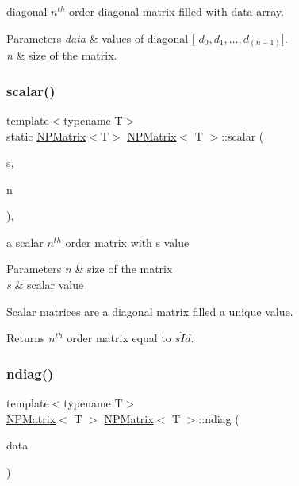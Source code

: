 diagonal $ n^{th} $ order diagonal matrix filled with data array. 


\begin{DoxyParams}{Parameters}
{\em data} & values of diagonal {\ttfamily \mbox{[}} $ d_0, d_1, ..., d_{(n-1)} ${\ttfamily \mbox{]}}. \\
\hline
{\em n} & size of the matrix. \\
\hline
\end{DoxyParams}
\mbox{\label{class_n_p_matrix_a3195b8dd4a279c3018122c3053997f8c}} 
\subsubsection{\texorpdfstring{scalar()}{scalar()}}
{\footnotesize\ttfamily template$<$typename T$>$ \\
static \mbox{\hyperlink{class_n_p_matrix}{N\+P\+Matrix}}$<$T$>$ \mbox{\hyperlink{class_n_p_matrix}{N\+P\+Matrix}}$<$ T $>$\+::scalar (\begin{DoxyParamCaption}\item[{T}]{s,  }\item[{\mbox{\hyperlink{typedef_8h_a1b140a2034db3f5dfe18a987745df43a}{ul\+\_\+t}}}]{n }\end{DoxyParamCaption})\hspace{0.3cm}{\ttfamily [inline]}, {\ttfamily [static]}}



a scalar $ n^{th} $ order matrix with {\ttfamily s} value 


\begin{DoxyParams}{Parameters}
{\em n} & size of the matrix \\
\hline
{\em s} & scalar value\\
\hline
\end{DoxyParams}
Scalar matrices are a diagonal matrix filled a unique value. \begin{DoxyReturn}{Returns}
$ n^{th} $ order matrix equal to $ s \dot Id $. 
\end{DoxyReturn}
\mbox{\label{class_n_p_matrix_a16aa6a18c33005300049ab1a39cbfbc2}} 
\subsubsection{\texorpdfstring{ndiag()}{ndiag()}}
{\footnotesize\ttfamily template$<$typename T$>$ \\
\mbox{\hyperlink{class_n_p_matrix}{N\+P\+Matrix}}$<$ T $>$ \mbox{\hyperlink{class_n_p_matrix}{N\+P\+Matrix}}$<$ T $>$\+::ndiag (\begin{DoxyParamCaption}\item[{const std\+::vector$<$ \mbox{\hyperlink{class_n_vector}{N\+Vector}}$<$ T $>$ $>$ \&}]{data }\end{DoxyParamCaption})\hspace{0.3cm}{\ttfamily [static]}}



